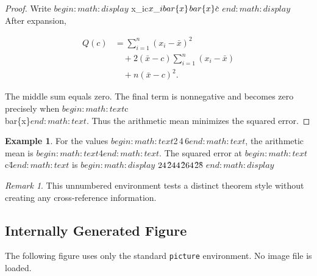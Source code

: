 \documentclass[10pt,a4paper,twocolumn]{article}
\theoremstyle{definition}
\newtheorem{example}[theorem]{Example}
\theoremstyle{remark}
\newtheorem*{remark}{Remark}
\begin{document}
\begin{proof}
Write
$begin:math:display$
  x\_i\-c\=\(x\_i\-\\bar\{x\}\)\+\(\\bar\{x\}\-c\)\.
$end:math:display$
After expansion,

\begin{align*}
  Q(c)
    &=
    \sum_{i=1}^{n}(x_i-\bar{x})^2\\
    &\quad+
    2(\bar{x}-c)
    \sum_{i=1}^{n}(x_i-\bar{x})\\
    &\quad+
    n(\bar{x}-c)^2.
\end{align*}

The middle sum equals zero. The final term is nonnegative and becomes
zero precisely when $begin:math:text$c\=\\bar\{x\}$end:math:text$. Thus the arithmetic mean minimizes
the squared error.
\end{proof}

\begin{example}
For the values $begin:math:text$2\,4\,6$end:math:text$, the arithmetic mean is $begin:math:text$4$end:math:text$. The squared
error at $begin:math:text$c\=4$end:math:text$ is
$begin:math:display$
  \(2\-4\)\^2\+\(4\-4\)\^2\+\(6\-4\)\^2\=8\.
$end:math:display$
\end{example}

\begin{remark}
This unnumbered environment tests a distinct theorem style without
creating any cross-reference information.
\end{remark}

\subsection{Internally Generated Figure}

The following figure uses only the standard \texttt{picture}
environment. No image file is loaded.
\end{document}
